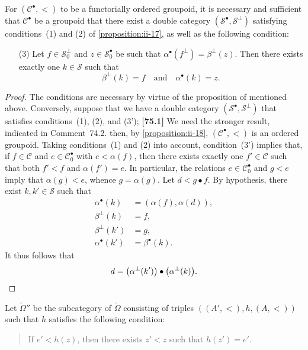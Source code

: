 \documentclass[a4paper,fleqn]{article}
\theoremstyle{plain}
\newenvironment{proposition}[1]
  {\renewcommand\theinnerproposition{#1}\innerproposition}
  {\endinnerproposition}
\theoremstyle{definition}
\newenvironment{longcomm}[1]
  {\noindent\textbf{[#1]}\rmfamily}
  {}
\newcommand{\oldpage}[1]{{\marginpar{\footnotesize$\bigg\vert$\,\,\,\,\textit{p.~#1}}}}
\newcommand{\textand}{\quad\text{and}\quad}
\newcommand{\CC}{\mathcal{C}}
\renewcommand{\SS}{\mathcal{S}}
\newcommand{\smallbullet}{\bullet}
\begin{document}
\begin{proposition}{20}
\label{proposition:ii-20}
  For $(\CC^\smallbullet,<)$ to be a functorially ordered groupoid, it is necessary and sufficient that $\CC^\smallbullet$ be a groupoid that there exist a double category $(\SS^\smallbullet,\SS^\perp)$ satisfying conditions~(1) and (2) of \cref{proposition:ii-17}, as well as the following condition:
  \begin{enumerate}
    \item[\normalfont(3\textquotesingle)]
      Let $f\in\SS_0^\perp$ and $z\in\SS_0^\smallbullet$ be such that $\alpha^\smallbullet(f^\perp)=\beta^\perp(z)$.
      Then there exists exactly one $k\in\SS$ such that
      \[
        \beta^\perp(k)=f
        \textand
        \alpha^\smallbullet(k)=z.
      \]
  \end{enumerate}
\end{proposition}

\begin{proof}
  \oldpage{403}
  The conditions are necessary by virtue of the proposition of \cite{3a} mentioned above.
  Conversely, suppose that we have a double category $(\SS^\smallbullet,\SS^\perp)$ that satisfies conditions~(1), (2), and (3');
  \begin{longcomm}{75.1}
    We need the stronger result, indicated in Comment~74.2.
  \end{longcomm}
  then, by \cref{proposition:ii-18}, $(\CC^\smallbullet,<)$ is an ordered groupoid.
  Taking conditions~(1) and (2) into account, condition~(3') implies that, if $f\in\CC$ and $e\in\CC_0^\smallbullet$ with $e<\alpha(f)$, then there exists exactly one $f'\in\CC$ such that both $f'<f$ and $\alpha(f')=e$.
  In particular, the relations $e\in\CC_0^\smallbullet$ and $g<e$ imply that $\alpha(g)<e$, whence $g=\alpha(g)$.
  Let $d<g\smallbullet f$.
  By hypothesis, there exist $k,k'\in\SS$ such that
  \[
    \begin{aligned}
      \alpha^\smallbullet(k)
      &=(\alpha(f),\alpha(d)),
    \\\beta^\perp(k)
      &=f,
    \\\beta^\perp(k')
      &=g,
    \\\alpha^\smallbullet(k')
      &=\beta^\smallbullet(k).
    \end{aligned}
  \]
  It thus follows that
  \[
    d = \big(\alpha^\perp(k')\big)\smallbullet\big(\alpha^\perp(k)\big).
    \qedhere
  \]
\end{proof}

Let $\widetilde{\Omega}''$ be the subcategory of $\widetilde{\Omega}$ consisting of triples $((A',<),h,(A,<))$ such that $h$ satisfies the following condition:
\begin{quote}
  If $e'<h(z)$, then there exists $z'<z$ such that $h(z')=e'$.
\end{quote}
\end{document}
